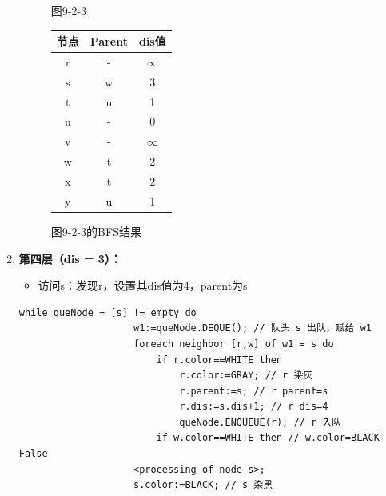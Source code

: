 \documentclass{article}
\begin{document}
\begin{enumerate}
\begin{figure}[htbp]
\begin{minipage}[b]{0.6\textwidth}
                \caption{图9-2-3}
                \label{fig:9-2-3}
        \end{minipage}%
        \hfill%
        \begin{minipage}[b]{0.4\textwidth}    %
            \centering
                \begin{tabular}{|c|c|c|}
                    \hline
                    节点 & Parent & dis值 \\
                    \hline
                    r & - & $\infty$ \\
                    s & w & 3 \\
                    t & u & 1 \\
                    u & - & 0 \\
                    v & - & $\infty$ \\
                    w & t & 2 \\
                    x & t & 2 \\
                    y & u & 1 \\
                    \hline
                \end{tabular}
                \caption{图9-2-3的BFS结果}
                \label{tab:graph9-2-3-bfs}
        \end{minipage}
    \end{figure}

    \pagebreak

    \item \textbf{第四层（dis = 3）：}
    
    \begin{itemize}
        \item 访问s：发现r，设置其dis值为4，parent为s
    \end{itemize}

    \begin{lstlisting}[style=algorithmPPT]
                while queNode = [s] != empty do 
                    w1:=queNode.DEQUE(); // 队头 s 出队，赋给 w1
                    foreach neighbor [r,w] of w1 = s do
                        if r.color==WHITE then
                            r.color:=GRAY; // r 染灰
                            r.parent:=s; // r parent=s
                            r.dis:=s.dis+1; // r dis=4
                            queNode.ENQUEUE(r); // r 入队
                        if w.color==WHITE then // w.color=BLACK False
                    <processing of node s>;
                    s.color:=BLACK; // s 染黑
                \end{lstlisting}    


\end{enumerate}
\end{document}
